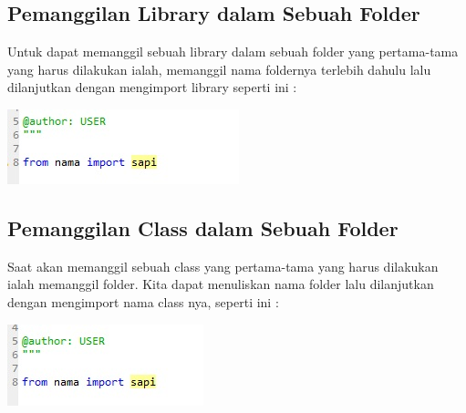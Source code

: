 \documentclass[a4paper,12pt]{report}
\begin{document}
\subsection{Pemanggilan Library dalam Sebuah Folder}
\par Untuk dapat memanggil sebuah library dalam sebuah folder yang pertama-tama yang harus dilakukan ialah, memanggil nama foldernya terlebih dahulu lalu dilanjutkan dengan mengimport
library seperti ini :
    \begin{center}
    \includegraphics[width=11cm\textwidth]{Figure/libfolder.jpg}
    \end{center}

\subsection{Pemanggilan Class dalam Sebuah Folder}
\par Saat akan memanggil sebuah class yang pertama-tama yang harus dilakukan ialah memanggil  folder.
Kita dapat menuliskan nama folder lalu dilanjutkan dengan mengimport nama class
nya, seperti ini :
    \begin{center}
    \includegraphics[width=11cm\textwidth]{Figure/clasfolder.jpg}
    \end{center}
    
\end{document}
